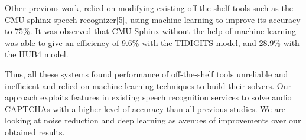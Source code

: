 Other previous work, relied on modifying existing off the shelf tools such as the CMU sphinx speech recognizer[5], using machine learning to improve its accuracy to 75\%. It was observed that CMU Sphinx without the help of machine learning was able to give an efficiency of 9.6\% with the TIDIGITS model, and 28.9\% with the HUB4 model. \newline

Thus, all these systems found performance of off-the-shelf tools unreliable and inefficient and relied on machine learning techniques to build their solvers. Our approach exploits features in existing speech recognition services to solve audio CAPTCHAs with a higher level of accuracy than all previous studies. We are looking at noise reduction and deep learning as avenues of improvements over our obtained results.




